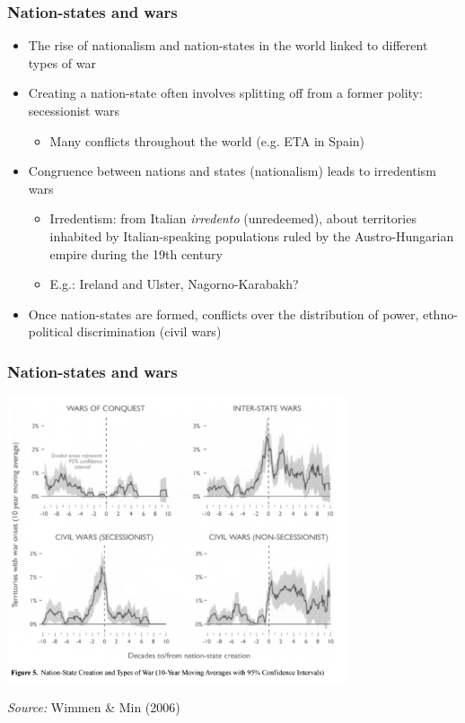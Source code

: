 \documentclass[utf8, xcolor=dvipsnames]{beamer}
\begin{document}
\begin{frame}
\frametitle{Nation-states and wars}
\centering

\begin{itemize}[<+->]
  \item The rise of nationalism and nation-states in the world linked to different types of war
  \item Creating a nation-state often involves splitting off from a former polity: secessionist wars
  \begin{itemize}
    \item Many conflicts throughout the world (e.g. ETA in Spain)
  \end{itemize}
  \item Congruence between nations and states (nationalism) leads to irredentism wars
  \begin{itemize}
    \item Irredentism: from Italian \textit{irredento} (unredeemed), about territories inhabited by Italian-speaking populations ruled by the Austro-Hungarian empire during the 19th century
    \item E.g.: Ireland and Ulster, Nagorno-Karabakh?
  \end{itemize}
  \item Once nation-states are formed, conflicts over the distribution of power, ethno-political discrimination (civil wars)
\end{itemize}

\end{frame}

\begin{frame}
\frametitle{Nation-states and wars}
\centering

\includegraphics[width = 0.75\textwidth]{img/wimmer_min_fig5}

{\scriptsize \textit{Source:} Wimmen \& Min (2006)}

\end{frame}
\end{document}
